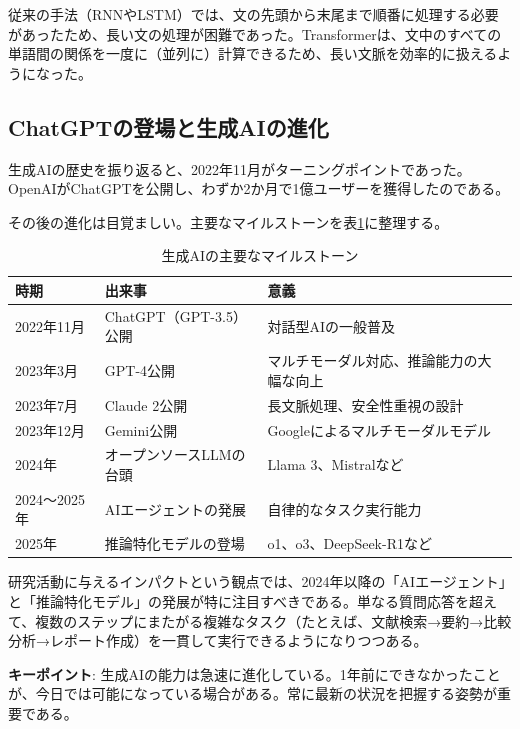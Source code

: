 従来の手法（RNNやLSTM）では、文の先頭から末尾まで順番に処理する必要があったため、長い文の処理が困難であった。Transformerは、文中のすべての単語間の関係を一度に（並列に）計算できるため、長い文脈を効率的に扱えるようになった。

\subsection{ChatGPTの登場と生成AIの進化}

生成AIの歴史を振り返ると、2022年11月がターニングポイントであった。OpenAIがChatGPTを公開し、わずか2か月で1億ユーザーを獲得したのである。

その後の進化は目覚ましい。主要なマイルストーンを表\ref{tab:ai_milestones}に整理する。

\begin{table}[htbp]
\centering
\caption{生成AIの主要なマイルストーン}
\label{tab:ai_milestones}
\footnotesize
\begin{tabular}{lp{3.5cm}p{4cm}}
\toprule
時期 & 出来事 & 意義 \\
\midrule
2022年11月 & ChatGPT（GPT-3.5）公開 & 対話型AIの一般普及 \\
2023年3月 & GPT-4公開 & マルチモーダル対応、推論能力の大幅な向上 \\
2023年7月 & Claude 2公開 & 長文脈処理、安全性重視の設計 \\
2023年12月 & Gemini公開 & Googleによるマルチモーダルモデル \\
2024年 & オープンソースLLMの台頭 & Llama 3、Mistralなど \\
2024〜2025年 & AIエージェントの発展 & 自律的なタスク実行能力 \\
2025年 & 推論特化モデルの登場 & o1、o3、DeepSeek-R1など \\
\bottomrule
\end{tabular}
\end{table}

研究活動に与えるインパクトという観点では、2024年以降の「AIエージェント」と「推論特化モデル」の発展が特に注目すべきである。単なる質問応答を超えて、複数のステップにまたがる複雑なタスク（たとえば、文献検索→要約→比較分析→レポート作成）を一貫して実行できるようになりつつある。

\begin{screen}
\textbf{キーポイント}: 生成AIの能力は急速に進化している。1年前にできなかったことが、今日では可能になっている場合がある。常に最新の状況を把握する姿勢が重要である。
\end{screen}

